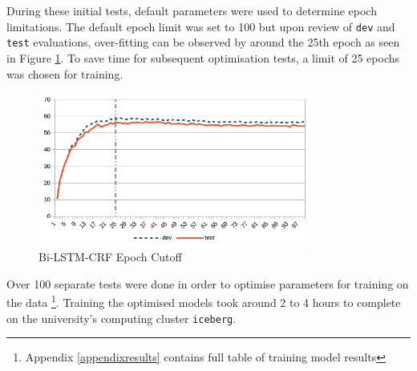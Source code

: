 During these initial tests, default parameters were used to determine epoch limitations. The default epoch limit was set to 100 but upon review of \texttt{dev} and \texttt{test} evaluations, over-fitting can be observed by around the 25th epoch as seen in Figure \ref{fig:bilstmcrfepochcutoff}. To save time for subsequent optimisation tests, a limit of 25 epochs was chosen for training. 

\begin{figure}[H]
\centering
\includegraphics[width=0.8\textwidth]{images/bi_lstm_crf_60_20_20_defaults_epoch_cutoff.png}
\caption{Bi-LSTM-CRF Epoch Cutoff}
\label{fig:bilstmcrfepochcutoff}
\end{figure}

Over 100 separate tests were done in order to optimise parameters for training on the \dimsum data \footnote{Appendix \ref{appendixresults} contains full table of training model results}. Training the optimised models took around 2 to 4 hours to complete on the university's computing cluster \texttt{iceberg}.

